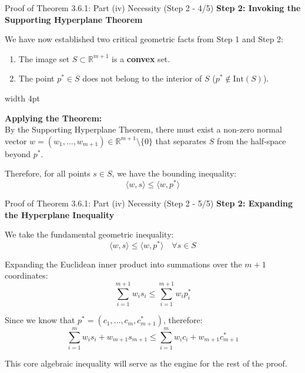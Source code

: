 \documentclass[10pt, aspectratio=169, xcolor=dvipsnames]{beamer}
\newcommand{\lead}[1]{{\color{UniBlue}\bfseries #1}}
\begin{document}
\begin{frame}{Proof of Theorem 3.6.1: Part (iv) Necessity (Step 2 - 4/5)}
    \lead{Step 2: Invoking the Supporting Hyperplane Theorem}\\
    \vspace{0.4cm}
    
    We have now established two critical geometric facts from Step 1 and Step 2:
    \vspace{0.2cm}
    \begin{enumerate}
        \item The image set $S \subset \mathbb{R}^{m+1}$ is a \textbf{convex} set.
        \item The point $p^* \in S$ does not belong to the interior of $S$ ($p^* \notin \text{Int}(S)$).
    \end{enumerate}
    
    \vspace{0.5cm}
    \noindent
    {\color{Teal}\vrule width 4pt}%
    \hspace{10pt}%
    \begin{minipage}{\dimexpr\textwidth-14pt\relax}
        \color{Slate}
        \textbf{Applying the Theorem:}\\
        By the Supporting Hyperplane Theorem, there must exist a non-zero normal vector $w = (w_1, \dots, w_{m+1}) \in \mathbb{R}^{m+1} \setminus \{0\}$ that separates $S$ from the half-space beyond $p^*$. 
        
        \vspace{0.2cm}
        Therefore, for all points $s \in S$, we have the bounding inequality:
        \[ \langle w, s \rangle \le \langle w, p^* \rangle \]
    \end{minipage}
\end{frame}

\begin{frame}{Proof of Theorem 3.6.1: Part (iv) Necessity (Step 2 - 5/5)}
    \lead{Step 2: Expanding the Hyperplane Inequality}\\
    \vspace{0.4cm}
    
    We take the fundamental geometric inequality:
    \[ \langle w, s \rangle \le \langle w, p^* \rangle \quad \forall s \in S \]
    
    \vspace{0.2cm}
    Expanding the Euclidean inner product into summations over the $m+1$ coordinates:
    \[ \sum_{i=1}^{m+1} w_i s_i \le \sum_{i=1}^{m+1} w_i p^*_i \]
    
    \vspace{0.2cm}
    Since we know that $p^* = (c_1, \dots, c_m, c^*_{m+1})$, therefore:
    \vspace{0.3cm}
    \[ 
        \sum_{i=1}^m w_i s_i + w_{m+1} s_{m+1} \le \sum_{i=1}^m w_i c_i + w_{m+1} c^*_{m+1}
    \]
    
    \vspace{0.2cm}
    This core algebraic inequality will serve as the engine for the rest of the proof.
\end{frame}
\end{document}
